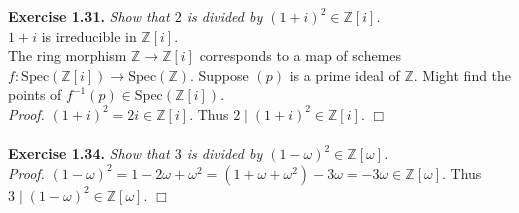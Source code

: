 \documentclass{article}
\begin{document}



\textbf{Exercise 1.31.}
\emph{Show that $2$ is divided by $(1+i)^2 \in \mathbb{Z}[i]$.} \\

$1+i$ is irreducible in $\mathbb{Z}[i]$. \\

The ring morphism $\mathbb{Z} \rightarrow \mathbb{Z}[i]$
corresponds to a map of schemes
$f: \text{Spec}(\mathbb{Z}[i]) \rightarrow \text{Spec}(\mathbb{Z})$.
Suppose $(p)$ is a prime ideal of $\mathbb{Z}$.
Might find the points of $f^{-1}(p) \in \text{Spec}(\mathbb{Z}[i])$. \\

\emph{Proof.}
$(1+i)^2 = 2i \in \mathbb{Z}[i]$.
Thus $2 \mid (1+i)^2 \in \mathbb{Z}[i]$.
$\Box$ \\\\






\textbf{Exercise 1.34.}
\emph{Show that $3$ is divided by $(1-\omega)^2 \in \mathbb{Z}[\omega]$.} \\

\emph{Proof.}
$(1 - \omega)^2
= 1 - 2\omega + \omega^2
= (1 + \omega + \omega^2) - 3 \omega
= - 3 \omega \in \mathbb{Z}[\omega]$.
Thus $3 \mid (1 - \omega)^2 \in \mathbb{Z}[\omega]$.
$\Box$ \\\\



\end{document}
